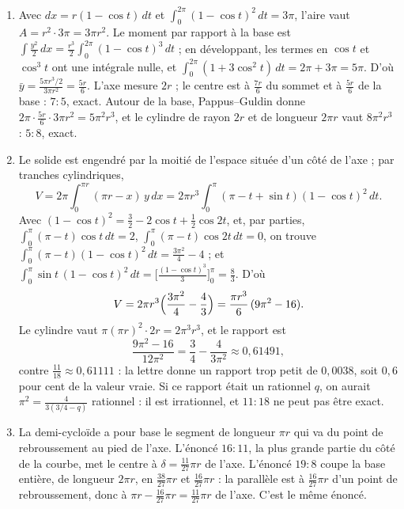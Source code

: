\documentclass[11pt,a4paper]{article}
\begin{document}
\begin{solution}
\begin{enumerate}
\item Avec $dx = r(1 - \cos t)\,dt$ et $\int_0^{2\pi}(1 - \cos t)^2\,dt = 3\pi$,
  l'aire vaut $A = r^2\cdot 3\pi = 3\pi r^2$. Le moment par rapport à la base est
  $\int \frac{y^2}{2}\,dx = \frac{r^3}{2}\int_0^{2\pi}(1 - \cos t)^3\,dt$ ; en
  développant, les termes en $\cos t$ et $\cos^3 t$ ont une intégrale nulle, et
  $\int_0^{2\pi}(1 + 3\cos^2 t)\,dt = 2\pi + 3\pi = 5\pi$. D'où
  $\bar y = \frac{5\pi r^3/2}{3\pi r^2} = \frac{5r}{6}$. L'axe mesure $2r$ ; le
  centre est à $\frac{7r}{6}$ du sommet et à $\frac{5r}{6}$ de la base : $7 : 5$,
  exact. Autour de la base, Pappus--Guldin donne
  $2\pi\cdot\frac{5r}{6}\cdot 3\pi r^2 = 5\pi^2r^3$, et le cylindre de rayon $2r$ et
  de longueur $2\pi r$ vaut $8\pi^2r^3$ : $5 : 8$, exact.
\item Le solide est engendré par la moitié de l'espace située d'un côté de l'axe ;
  par tranches cylindriques,
  \[
  V = 2\pi\int_0^{\pi r}(\pi r - x)\,y\,dx
  = 2\pi r^3\int_0^{\pi}(\pi - t + \sin t)(1 - \cos t)^2\,dt .
  \]
  Avec $(1 - \cos t)^2 = \frac32 - 2\cos t + \frac12\cos 2t$, et, par parties,
  $\int_0^\pi(\pi - t)\cos t\,dt = 2$, $\int_0^\pi(\pi - t)\cos 2t\,dt = 0$, on
  trouve $\int_0^\pi(\pi - t)(1 - \cos t)^2\,dt = \frac{3\pi^2}{4} - 4$ ; et
  $\int_0^\pi \sin t\,(1 - \cos t)^2\,dt = \bigl[\frac{(1 - \cos t)^3}{3}\bigr]_0^\pi
  = \frac83$. D'où
  \[
  V = 2\pi r^3\Bigl(\frac{3\pi^2}{4} - \frac43\Bigr) = \frac{\pi r^3}{6}\,(9\pi^2 - 16).
  \]
  Le cylindre vaut $\pi(\pi r)^2\cdot 2r = 2\pi^3r^3$, et le rapport est
  \[
  \frac{9\pi^2 - 16}{12\pi^2} = \frac34 - \frac{4}{3\pi^2} \approx 0{,}61491,
  \]
  contre $\frac{11}{18} \approx 0{,}61111$ : la lettre donne un rapport trop petit
  de $0{,}0038$, soit $0{,}6$ pour cent de la valeur vraie. Si ce rapport était un
  rationnel $q$, on aurait $\pi^2 = \frac{4}{3(3/4 - q)}$ rationnel : il est
  irrationnel, et $11 : 18$ ne peut pas être exact.
\item La demi-cycloïde a pour base le segment de longueur $\pi r$ qui va du point
  de rebroussement au pied de l'axe. L'énoncé $16 : 11$, la plus grande partie
  du côté de la courbe, met le centre à $\delta = \frac{11}{27}\pi r$ de l'axe.
  L'énoncé $19 : 8$ coupe la base entière, de longueur $2\pi r$, en
  $\frac{38}{27}\pi r$ et $\frac{16}{27}\pi r$ : la parallèle est à
  $\frac{16}{27}\pi r$ d'un point de rebroussement, donc à
  $\pi r - \frac{16}{27}\pi r = \frac{11}{27}\pi r$ de l'axe. C'est le même énoncé.

\end{enumerate}
\end{solution}
\end{document}
